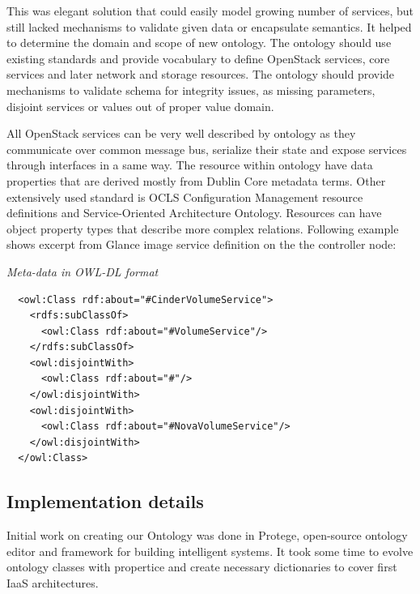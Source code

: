 This was elegant solution that could easily model growing number of services, but still lacked mechanisms to validate given data or encapsulate semantics. It helped to determine the domain and scope of new ontology. The ontology should use existing standards and provide vocabulary to define OpenStack services, core services and later network and storage resources. The ontology should provide mechanisms to validate schema for integrity issues, as missing parameters, disjoint services or values out of proper value domain.


All OpenStack services can be very well described by ontology as they communicate over common message bus, serialize their state and expose services through interfaces in a same way. The resource within ontology have data properties that are derived mostly from Dublin Core metadata terms. Other extensively used standard is OCLS Configuration Management resource definitions and Service-Oriented Architecture Ontology.  Resources can have object property types that describe more complex relations. Following example shows excerpt from Glance image service definition on the the controller node: 

\medskip

\noindent
{\it Meta-data in OWL-DL format}
\begin{verbatim}
  <owl:Class rdf:about="#CinderVolumeService">
    <rdfs:subClassOf>
      <owl:Class rdf:about="#VolumeService"/>
    </rdfs:subClassOf>
    <owl:disjointWith>
      <owl:Class rdf:about="#"/>
    </owl:disjointWith>
    <owl:disjointWith>
      <owl:Class rdf:about="#NovaVolumeService"/>
    </owl:disjointWith>
  </owl:Class>
\end{verbatim}
\noindent

\subsection{Implementation details}


Initial work on creating our Ontology was done in Protege, open-source ontology editor and framework for building intelligent systems. It took some time to evolve ontology classes with propertice and create necessary dictionaries \cite{OntologyEvolution} to cover first IaaS architectures.

